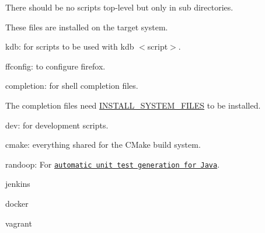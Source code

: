 There should be no scripts top-\/level but only in sub directories.

These files are installed on the target system.


\begin{DoxyItemize}
\item kdb\+: for scripts to be used with {\ttfamily kdb $<$script$>$}.
\item ffconfig\+: to configure firefox.
\item completion\+: for shell completion files.
\end{DoxyItemize}

The completion files need \hyperlink{doc_COMPILE_md}{I\+N\+S\+T\+A\+L\+L\+\_\+\+S\+Y\+S\+T\+E\+M\+\_\+\+F\+I\+L\+ES} to be installed.


\begin{DoxyItemize}
\item dev\+: for development scripts.
\item cmake\+: everything shared for the C\+Make build system.
\item randoop\+: For \href{https://randoop.github.io/randoop/}{\tt automatic unit test generation for Java}.
\end{DoxyItemize}


\begin{DoxyItemize}
\item jenkins
\item docker
\item vagrant 
\end{DoxyItemize}